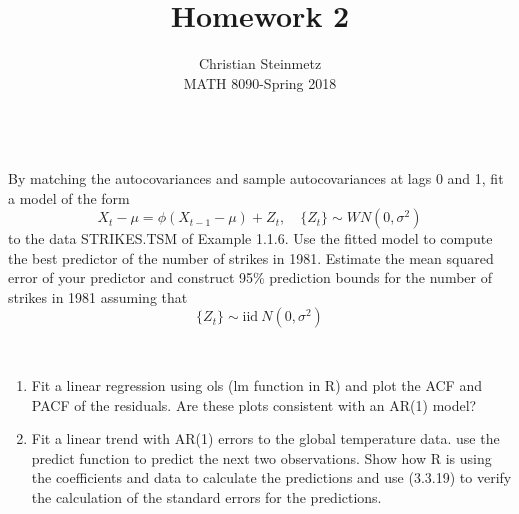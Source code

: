 \documentclass[12pt]{article}
\newenvironment{solution}[2][Solution]{\begin{trivlist}
	\item[\hskip \labelsep {\bfseries #1}]}{\end{trivlist}}
\newenvironment{problem}[2][Problem]{\begin{trivlist}
	\item[\hskip \labelsep {\bfseries #1}\hskip \labelsep {\bfseries #2.}]}{\end{trivlist}}
\begin{document}
	 
	 
	\title{Homework 2}%
	\author{Christian Steinmetz\\ %
	MATH 8090-Spring 2018} %
	 
	\maketitle
	
	\begin{problem}{6}
	$ $ \\
	By matching the autocovariances and sample autocovariances at lags 0 and 1,
	fit a model of the form
	\begin{equation*}
		X_t - \mu = \phi(X_{t-1} - \mu) + Z_t,  \quad \{{Z_t}\} \sim WN(0, \sigma^2)
	\end{equation*}
	to the data STRIKES.TSM of Example 1.1.6. Use the fitted model to compute
	the best predictor of the number of strikes in 1981. Estimate the mean squared
	error of your predictor and construct 95\% prediction bounds for the number of
	strikes in 1981 assuming that
	\begin{equation*}
	\{{Z_t}\} \sim \text{iid} \ N(0, \sigma^2)
	\end{equation*}
	
	\end{problem}
	
	\begin{solution}{}
		
	\end{solution}
	\pagebreak
	
	\begin{problem}{7}
	$ $
	\begin{enumerate}[label=(\alph*)]
		\item Fit a linear regression using ols (lm function in R) and plot the ACF and PACF of the residuals. Are these plots consistent with an AR(1) model?
		\item Fit a linear trend with AR(1) errors to the global temperature data. use the predict function to predict the next two observations. Show how R is using the coefficients and data to calculate the predictions and use (3.3.19) to verify the calculation of the standard errors for the predictions. 
	\end{enumerate}
	\end{problem}
		
\end{document}

